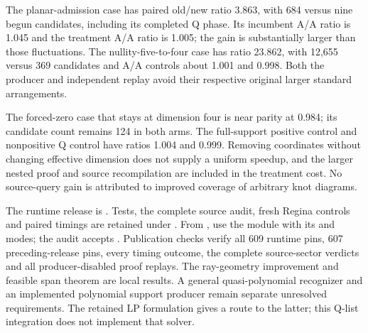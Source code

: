 

The planar-admission case has paired old/new ratio 3.863, with 684 versus
nine begun candidates, including its completed Q phase. Its incumbent A/A
ratio is 1.045 and the treatment A/A ratio is 1.005; the gain is substantially
larger than those fluctuations. The nullity-five-to-four case has ratio
23.862, with 12,655 versus 369 candidates and A/A controls about 1.001 and
0.998. Both the producer and independent replay avoid their respective
original larger standard arrangements.

The forced-zero case that stays at dimension four is near parity at 0.984;
its candidate count remains 124 in both arms. The full-support positive
control and nonpositive Q control have ratios 1.004 and 0.999. Removing
coordinates without changing effective dimension does not supply a uniform
speedup, and the larger nested proof and source recompilation are included
in the treatment cost. No source-query gain is attributed to improved
coverage of arbitrary knot diagrams.

The runtime release is . Tests, the complete source audit,
fresh Regina controls and paired timings are retained under
. From , use the module
 with its  and
 modes; the audit accepts .
Publication checks verify all 609 runtime pins, 607 preceding-release
pins, every timing outcome, the complete source-sector verdicts and all
producer-disabled proof replays. The ray-geometry improvement and feasible
span theorem are local results. A general quasi-polynomial recognizer and
an implemented polynomial support producer remain separate unresolved
requirements. The retained LP formulation gives a route to the latter; this
Q-list integration does not implement that solver.
